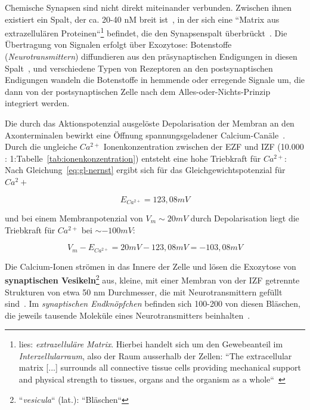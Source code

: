 {{Chemische Synapsen sind nicht direkt miteinander verbunden. 
Zwischen ihnen existiert ein Spalt, der ca. 20-40 nM breit ist~\cite[184]{KSJ+13}, in der sich eine ``Matrix aus extrazellulären Proteinen``\footnote{
 lies: \textit{extrazelluläre Matrix}. Hierbei handelt sich um den Gewebeanteil im \textit{Interzellularraum}, also der Raum ausserhalb der Zellen: ``The extracellular matrix {[...]} surrounds all connective tissue cells providing mechanical support and physical strength to tissues, organs and the organism as a whole``~\cite[3]{AHH+98}
} befindet, die den Synapsenspalt überbrückt~\cite[122]{BCP18}.
Die Übertragung von Signalen erfolgt über Exozytose: Botenstoffe (\textit{Neurotransmittern}) diffundieren aus den präsynaptischen Endigungen in diesen Spalt~\cite[122]{BCP18}, und verschiedene Typen von Rezeptoren an den postsynaptischen Endigungen wandeln die Botenstoffe in hemmende oder erregende Signale um, die dann von der postsynaptischen Zelle nach dem Alles-oder-Nichts-Prinzip integriert werden.

Die durch das Aktionspotenzial ausgelöste Depolarisation der Membran an den Axonterminalen bewirkt eine Öffnung spannungsgeladener Calcium-Canäle~\cite[184]{KSJ+13}.
Durch die ungleiche $Ca^{2+}$ Ionenkonzentration zwischen der EZF und IZF (10.000 : 1:Tabelle~\ref{tab:ionenkonzentration}) entsteht eine hohe Triebkraft für $Ca^{2+}$: Nach Gleichung~\ref{eq:gl-nernst} ergibt sich für das Gleichgewichtspotenzial für $Ca^2+$

\begin{equation}
 E_{Ca^{2+}} = 123,08 mV
 \label{eq:gl-eqca2}
\end{equation}



\pagebreak

und bei einem Membranpotenzial von $V_m \sim 20 mV$ durch Depolarisation liegt die Triebkraft für $Ca^{2+}$ bei $\sim -100 mV$:

\begin{equation}
 V_m - E_{Ca^{2+}} = 20 mV - 123,08 mV = -103,08 mV
 \label{eq:gl-triebkraftca2}
\end{equation}


Die Calcium-Ionen strömen in das Innere der Zelle und lösen die Exozytose von \textbf{synaptischen Vesikeln}\footnote{
 ``\textit{vesicula}`` (lat.): ``Bläschen``
} aus, kleine, mit einer Membran von der IZF getrennte Strukturen von etwa 50 nm Durchmesser, die mit Neurotransmittern gefüllt sind~\cite[1000]{BCP18}.
Im \textit{synaptischen Endknöpfchen} befinden sich 100-200 von diesen Bläschen, die jeweils tausende Moleküle eines Neurotransmitters beinhalten~\cite[184]{KSJ+13}.

}}
